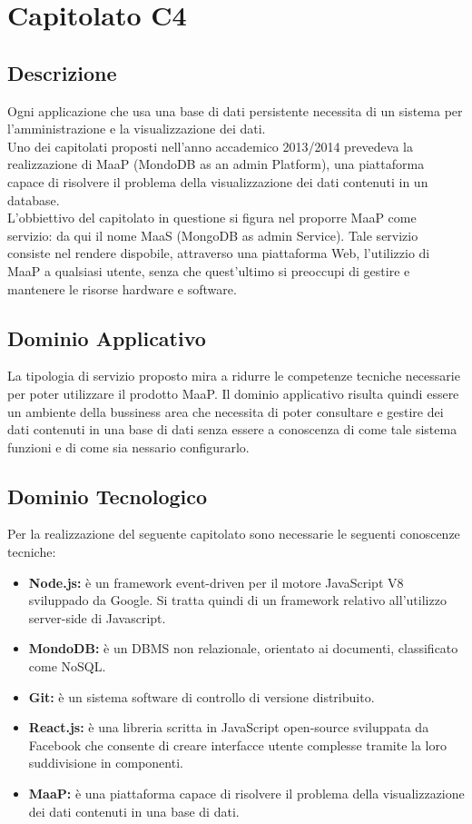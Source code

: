 \section{Capitolato C4}
\subsection{Descrizione}
Ogni applicazione che usa una base di dati persistente necessita di un sistema per l'amministrazione e la visualizzazione dei dati.\\ Uno dei capitolati proposti nell'anno accademico 2013/2014 prevedeva la realizzazione di MaaP (MondoDB as an admin Platform), una piattaforma capace di risolvere il problema della visualizzazione dei dati contenuti in un database.\\ 
L'obbiettivo del capitolato in questione si figura nel proporre MaaP come servizio: da qui il nome MaaS (MongoDB as admin Service). Tale servizio consiste nel rendere dispobile, attraverso una piattaforma Web, l'utilizzio di MaaP a qualsiasi utente, senza che quest'ultimo si preoccupi di gestire e mantenere le risorse hardware e software. 

\subsection{Dominio Applicativo}
La tipologia di servizio proposto mira a ridurre le competenze tecniche necessarie per poter utilizzare il prodotto MaaP. Il dominio applicativo risulta quindi essere un ambiente della bussiness area che necessita di poter consultare e gestire dei dati contenuti in una base di dati senza essere a conoscenza di come tale sistema funzioni e di come sia nessario configurarlo. 

\subsection{Dominio Tecnologico}
Per la realizzazione del seguente capitolato sono necessarie le seguenti conoscenze tecniche:
\begin{itemize}
	\item \textbf{Node.js:} è un framework event-driven per il motore JavaScript V8 sviluppado da Google. Si tratta quindi di un framework relativo all'utilizzo server-side di Javascript. 
	\item \textbf{MondoDB:} è un DBMS non relazionale, orientato ai documenti, classificato come NoSQL. 
	\item \textbf{Git:} è un sistema software di controllo di versione distribuito. 
	\item \textbf{React.js:} è una libreria scritta in JavaScript open-source sviluppata da Facebook che consente di creare interfacce utente complesse tramite la loro suddivisione in componenti. 
	\item \textbf{MaaP:} è una piattaforma capace di risolvere il problema della visualizzazione dei dati contenuti in una base di dati.	
\end{itemize}

